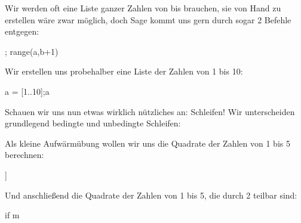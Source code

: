 \documentclass[fontsize=12pt,paper=a4,twoside,bibtotoc,idxtotoc,
liststotoc,pagesize,BCOR1.2cm,DIV15,chapterprefix,pagesize=pdftex]{scrbook}
\theoremstyle{plain}
\theoremstyle{definition}
\theoremstyle{remark}
\begin{document}
Wir werden oft eine Liste ganzer Zahlen von  bis  brauchen, sie von Hand zu erstellen wäre zwar möglich, doch Sage kommt uns 
gern durch sogar 2 Befehle entgegen:
  \begin{sagein}
  [a..b] ; range(a,b+1)
  \end{sagein}
Wir erstellen uns probehalber eine Liste der Zahlen von 1 bis 10:
\begin{sagein}
 a = [1..10];a
\end{sagein}
\begin{sageout}
 [1, 2, 3, 4, 5, 6, 7, 8, 9, 10]
\end{sageout}
Schauen wir uns nun etwas wirklich nützliches an: Schleifen! Wir unterscheiden grundlegend bedingte und unbedingte Schleifen:
  \begin{sagein}
  \end{sagein}
Als kleine Aufwärmübung wollen wir uns die Quadrate der Zahlen von 1 bis 5 berechnen:
  \begin{sagein}
  [m^2 for m in [1..5] ]
  \end{sagein}
  \begin{sageout}
  [1, 4, 9, 16, 25]
  \end{sageout}
Und anschließend die Quadrate der Zahlen von 1 bis 5, die durch 2 teilbar sind:
  \begin{sagein}
  [m^2 for m in [1..5] if m%
  \end{sagein}
  \begin{sageout}
  [4, 16]
  \end{sageout}
\end{document}

